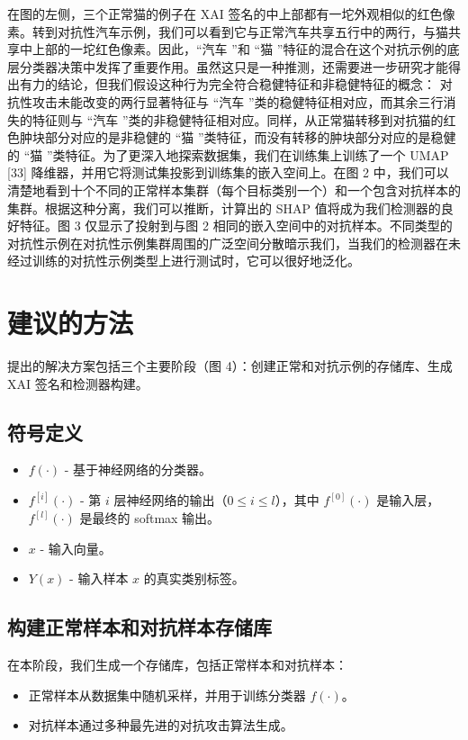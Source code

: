 \documentclass[12pt, a4paper]{ctexart} %
\begin{document}
在图的左侧，三个正常猫的例子在 XAI 签名的中上部都有一坨外观相似的红色像素。转到对抗性汽车示例，我们可以看到它与正常汽车共享五行中的两行，与猫共享中上部的一坨红色像素。因此，“汽车 ”和 “猫 ”特征的混合在这个对抗示例的底层分类器决策中发挥了重要作用。虽然这只是一种推测，还需要进一步研究才能得出有力的结论，但我们假设这种行为完全符合稳健特征和非稳健特征的概念： 对抗性攻击未能改变的两行显著特征与 “汽车 ”类的稳健特征相对应，而其余三行消失的特征则与 “汽车 ”类的非稳健特征相对应。同样，从正常猫转移到对抗猫的红色肿块部分对应的是非稳健的 “猫 ”类特征，而没有转移的肿块部分对应的是稳健的 “猫 ”类特征。为了更深入地探索数据集，我们在训练集上训练了一个 UMAP [33] 降维器，并用它将测试集投影到训练集的嵌入空间上。在图 2 中，我们可以清楚地看到十个不同的正常样本集群（每个目标类别一个）和一个包含对抗样本的集群。根据这种分离，我们可以推断，计算出的 SHAP 值将成为我们检测器的良好特征。图 3 仅显示了投射到与图 2 相同的嵌入空间中的对抗样本。不同类型的对抗性示例在对抗性示例集群周围的广泛空间分散暗示我们，当我们的检测器在未经过训练的对抗性示例类型上进行测试时，它可以很好地泛化。


\section{建议的方法}
提出的解决方案包括三个主要阶段（图 4）：创建正常和对抗示例的存储库、生成 XAI 签名和检测器构建。

\subsection{符号定义}
    \begin{itemize}
        \item \( f(\cdot) \) - 基于神经网络的分类器。
        \item \( f^{[i]}(\cdot) \) - 第 \( i \) 层神经网络的输出（\( 0 \leq i \leq l \)），其中 \( f^{[0]}(\cdot) \) 是输入层，\( f^{[l]}(\cdot) \) 是最终的 softmax 输出。
        \item \( x \) - 输入向量。
        \item \( Y(x) \) - 输入样本 \( x \) 的真实类别标签。
    \end{itemize}

\subsection{构建正常样本和对抗样本存储库}
在本阶段，我们生成一个存储库，包括正常样本和对抗样本：
    \begin{itemize}
        \item 正常样本从数据集中随机采样，并用于训练分类器 \( f(\cdot) \)。
        \item 对抗样本通过多种最先进的对抗攻击算法生成。 
    \end{itemize}
\end{document}
